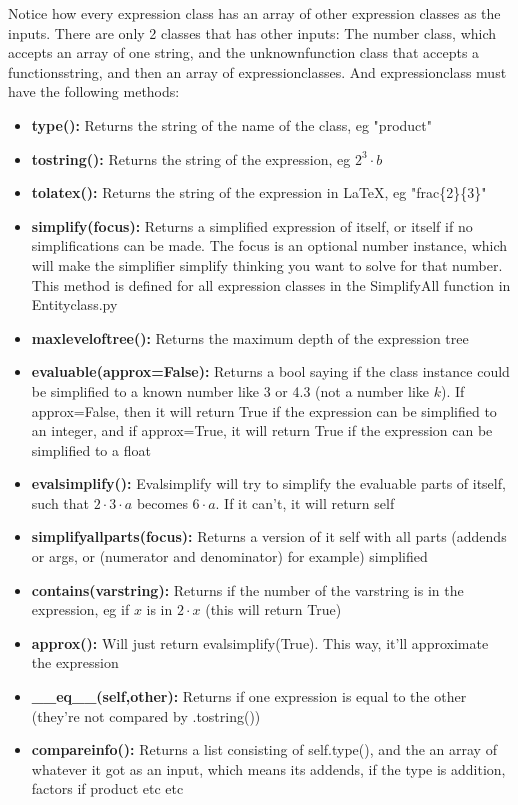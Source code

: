 \documentclass[11pt]{article}
\begin{document}
Notice how every expression class has an array of other expression classes as the inputs. There are only 2 classes that has other inputs: The number class, which accepts an array of one string, and the unknownfunction class that accepts a functionsstring, and then an array of expressionclasses.
And expressionclass must have the following methods:
\begin{itemize}
\item \textbf{type():} Returns the string of the name of the class, eg "product"
\item \textbf{tostring():} Returns the string of the expression, eg $2^3\cdot b$
\item \textbf{tolatex():} Returns the string of the expression in \LaTeX, eg "frac\{2\}\{3\}"
\item \textbf{simplify(focus):} Returns a simplified expression of itself, or itself if no simplifications can be made. The focus is an optional number instance, which will make the simplifier simplify thinking you want to solve for that number. This method is defined for all expression classes in the SimplifyAll function in Entityclass.py
\item \textbf{maxleveloftree():} Returns the maximum depth of the expression tree 
\item \textbf{evaluable(approx=False):} Returns a bool saying if the class instance could be simplified to a known number like 3 or 4.3 (not a number like $k$). If approx=False, then it will return True if the expression can be simplified to an integer, and if approx=True, it will return True if the expression can be simplified to a float
\item \textbf{evalsimplify():} Evalsimplify will try to simplify the evaluable parts of itself, such that $2\cdot 3\cdot a$ becomes $6\cdot a$. If it can't, it will return self
\item \textbf{simplifyallparts(focus):} Returns a version of it self with all parts (addends or args, or (numerator and denominator) for example) simplified
\item \textbf{contains(varstring):} Returns if the number of the varstring is in the expression, eg if $x$ is in $2\cdot x$ (this will return True)
\item \textbf{approx():} Will just return evalsimplify(True). This way, it'll approximate the expression
\item \textbf{ \_\_eq\_\_(self,other):} Returns if one expression is equal to the other (they're not compared by .tostring())
\item \textbf{compareinfo():} Returns a list consisting of self.type(), and the an array of whatever it got as an input, which means its addends, if the type is addition, factors if product etc etc

\end{itemize}
\end{document}

